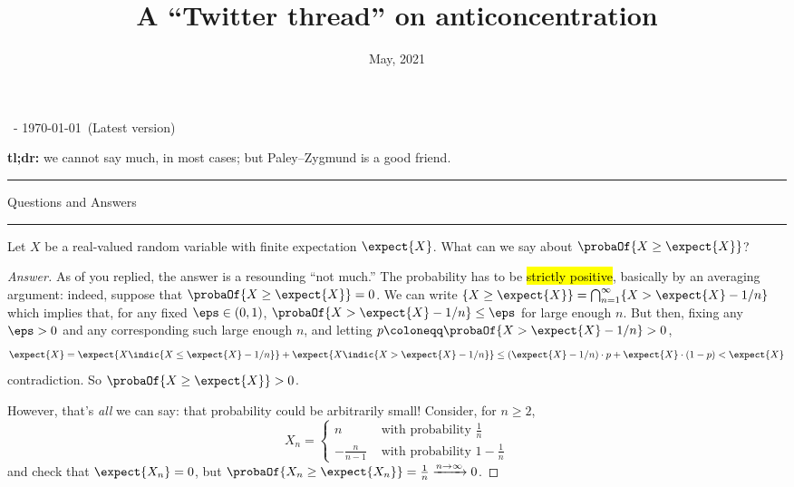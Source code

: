 \documentclass[10pt]{article}
\title{A ``Twitter thread'' on anticoncentration}
\date{May, 2021}
\renewcommand{\eqdef}{\coloneqq}
\begin{document}
\begin{flushleft}\sf\footnotesize
\makeatletter
\@date~- \today~(Latest version) \hfill \@title
\makeatother
\end{flushleft}
\vspace{5mm}

\noindent\textbf{tl;dr:} we cannot say much, in most cases; but Paley--Zygmund is a good friend.\bigskip

\hrule
\begin{center}\sc
Questions and Answers
\end{center}
\hrule\medskip

\begin{quest}
Let $X$ be a real-valued random variable with finite expectation $\expect{X}$. What can we say about $\probaOf{X \geq \expect{X}}$?
\end{quest}
\begin{proof}[Answer]
As  of you replied, the answer is a resounding ``not much.'' The probability has to be \hl{strictly positive}, basically by an averaging argument: indeed, suppose that $\probaOf{X \geq \expect{X}}=0$. We can write
$
    \{X \geq \expect{X}\} = \bigcap_{n=1}^\infty \{X > \expect{X} - 1/n\}
$
which implies that, for any fixed $\eps\in(0,1)$, $\probaOf{X > \expect{X} - 1/n} \leq \eps$ for large enough $n$. But then, fixing any $\eps>0$ and any corresponding such large enough $n$, and letting $p \eqdef \probaOf{X > \expect{X} - 1/n} > 0$,
\[
  \expect{X} = \expect{X\indic{X \leq \expect{X} - 1/n}} + \expect{X\indic{X > \expect{X} - 1/n}}
  \leq (\expect{X} - 1/n)\cdot p + \expect{X}\cdot (1-p) <  \expect{X}
\]
contradiction. So $\probaOf{X \geq \expect{X}}>0$.

\noindent However, that's \emph{all} we can say: that probability could be arbitrarily small! Consider, for $n\geq 2$,
\[
  X_n = \begin{cases}
      n & \text{ with probability } \frac{1}{n}\\
      -\frac{n}{n-1} & \text{ with probability } 1-\frac{1}{n}
    \end{cases}
\]
and check that $\expect{X_n}=0$, but $\probaOf{X_n \geq \expect{X_n}} = \frac{1}{n} \xrightarrow[]{n\to\infty} 0$.
\end{proof}
\end{document}
